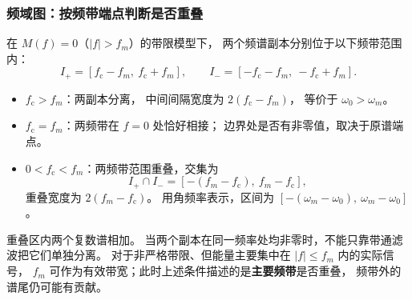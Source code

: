 \subsubsection{频域图：按频带端点判断是否重叠}
在 $M(f)=0$（$|f|>f_m$）的带限模型下，
两个频谱副本分别位于以下频带范围内：
\[
    I_+=[f_{\mathrm c}-f_m,\ f_{\mathrm c}+f_m],
    \qquad
    I_-=[-f_{\mathrm c}-f_m,\ -f_{\mathrm c}+f_m].
\]
\begin{itemize}
    \item $f_{\mathrm c}>f_m$：两副本分离，
          中间间隔宽度为 $2(f_{\mathrm c}-f_m)$，
          等价于 $\omega_0>\omega_m$。
    \item $f_{\mathrm c}=f_m$：两频带在 $f=0$ 处恰好相接；
          边界处是否有非零值，取决于原谱端点。
    \item $0<f_{\mathrm c}<f_m$：两频带范围重叠，交集为
          \[
              I_+\cap I_-
              =[-(f_m-f_{\mathrm c}),\ f_m-f_{\mathrm c}],
          \]
          重叠宽度为 $2(f_m-f_{\mathrm c})$。
          用角频率表示，区间为
          $[-(\omega_m-\omega_0),\ \omega_m-\omega_0]$。
\end{itemize}
重叠区内两个复数谱相加。
当两个副本在同一频率处均非零时，不能只靠带通滤波把它们单独分离。
对于非严格带限、但能量主要集中在 $|f|\leq f_m$ 内的实际信号，
$f_m$ 可作为有效带宽；此时上述条件描述的是\textbf{主要频带}是否重叠，
频带外的谱尾仍可能有贡献。

